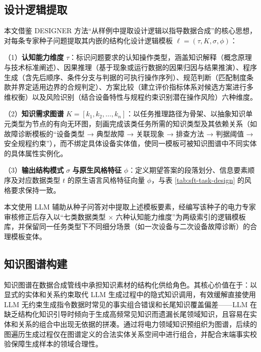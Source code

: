 \documentclass[fontset=fandol,type=master,campus=shenzhen,etitleauto=true]{hithesisbook}
\begin{document}
\subsection{设计逻辑提取}\label{ux4eceux4e13ux5bb6ux79cdux5b50ux4e2dux63d0ux53d6ux8bbeux8ba1ux903bux8f91}

本文借鉴 DESIGNER 方法“从样例中提取设计逻辑以指导数据合成”的核心思想\cite{ref54}，对每条专家种子问题提取其内嵌的结构化设计逻辑模板 $\ell = (\tau, K, \sigma, \phi)$：

\noindent （1）\textbf{认知能力维度} $\tau$：标识问题要求的认知操作类型，涵盖知识解释（概念原理与技术标准阐述）、因果推理（基于现象或运行数据的因果归因与结果推演）、程序生成（含先后顺序、条件分支与判据的可执行操作序列）、规范判断（匹配制度条款并界定适用边界的合规判定）、方案比较（建立评价指标体系对候选方案进行多维权衡）以及风险识别（结合设备特性与规程约束识别潜在操作风险）六种维度。

\noindent （2）\textbf{知识需求图谱} $K = [k_1, k_2, \ldots, k_n]$：以任务推理路径为骨架、以抽象知识单元类型为节点的有向无环图，刻画完成该类任务所需的知识类型及其依赖关系（如故障诊断模板的``设备类型 → 典型故障 → 关联现象 → 排查方法 → 判据阈值 → 安全规程约束''），而不绑定具体设备实体值，使同一模板可被知识图谱中不同实体的具体属性实例化。

\noindent （3）\textbf{输出结构模式} $\sigma$ \textbf{与原生风格特征} $\phi$：定义期望答案的段落划分、信息要素顺序及对应数据类型 $t$ 的原生语言风格特征向量 $\phi$，与表 \ref{tab:sft-task-design} 的风格要求保持一致。

本文使用 LLM 辅助从种子问答对中提取上述模板要素，经编写该种子的电力专家审核修正后存入以``七类数据类型 × 六种认知能力维度''为两级索引的逻辑模板库，并保留同一任务类型下不同细分场景（如一次设备与二次设备故障诊断）的合理模板变体。

\subsection{知识图谱构建}\label{ux9762ux5411ux4e03ux7c7bux6570ux636eux7684ux7535ux529bux77e5ux8bc6ux56feux8c31ux6784ux5efa}

知识图谱在数据合成管线中承担知识素材的结构化供给角色。其核心价值在于：以显式的实体和关系约束取代 LLM 生成过程中的隐式知识调用，有效缓解直接使用 LLM 无约束生成指令数据时常见的事实组合错误和长尾知识覆盖偏差------LLM 在缺乏结构化知识引导时倾向于生成高频常见知识而遗漏长尾领域知识，且容易在实体和关系的组合中出现无依据的拼凑。通过将电力领域知识预组织为图谱，后续的图遍历生成过程仅在图谱定义的合法实体关系空间中进行组合，并配合末端事实校验保障生成样本的领域合理性。
\end{document}
